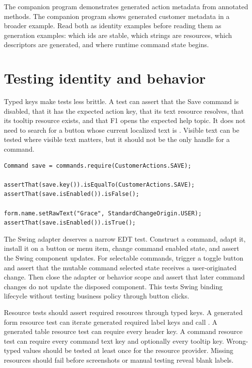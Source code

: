 The \generatedActionExample{} companion program demonstrates generated action
metadata from annotated methods. The \generationExample{} companion program
shows generated customer metadata in a broader example. Read both as identity
examples before reading them as generation examples: which ids are stable,
which strings are resources, which descriptors are generated, and where
runtime command state begins.

\section{Testing identity and behavior}

Typed keys make tests less brittle. A test can assert that the Save command is
disabled, that it has the expected action key, that its text resource resolves,
that its tooltip resource exists, and that F1 opens the expected help topic.
It does not need to search for a button whose current localized text is
. Visible text can be tested where visible text matters, but it
should not be the only handle for a command.

\begin{lstlisting}[caption={Testing command state by key.}]
Command save = commands.require(CustomerActions.SAVE);

assertThat(save.key()).isEqualTo(CustomerActions.SAVE);
assertThat(save.isEnabled()).isFalse();

form.name.setRawText("Grace", StandardChangeOrigin.USER);
assertThat(save.isEnabled()).isTrue();
\end{lstlisting}

The Swing adapter deserves a narrow EDT test. Construct a command, adapt it,
install it on a button or menu item, change command enabled state, and assert
the Swing component updates. For selectable commands, trigger a toggle button
and assert that the mutable command selected state receives a user-originated
change. Then close the adapter or behavior scope and assert that later command
changes do not update the disposed component. This tests Swing binding
lifecycle without testing business policy through button clicks.

Resource tests should assert required resources through typed keys. A generated
form resource test can iterate generated required label keys and call
. A generated table resource test can require every
header key. A command resource test can require every command text key and
optionally every tooltip key. Wrong-typed values should be tested at least once
for the resource provider. Missing resources should fail before screenshots or
manual testing reveal blank labels.


